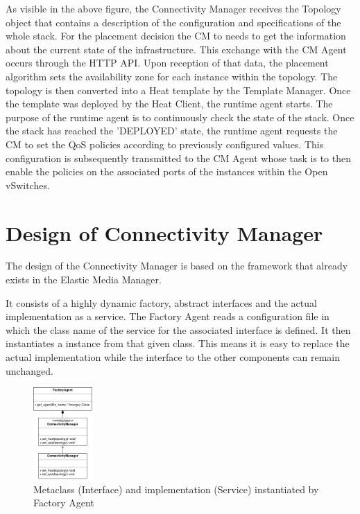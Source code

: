 As visible in the above figure, the Connectivity Manager receives the Topology object that contains a description of the configuration and specifications of the whole stack. For the placement decision the CM to needs to get the information about the current state of the infrastructure. This exchange with the CM Agent occurs through the HTTP API. Upon reception of that data, the placement algorithm sets the availability zone for each instance within the topology. The topology is then converted into a Heat template by the Template Manager. Once the template  was deployed by the Heat Client, the runtime agent starts. The purpose of the runtime agent is to continuously check the state of the stack. Once the stack has reached the 'DEPLOYED' state, the runtime agent requests the CM to set the QoS policies according to previously configured values. This configuration is subsequently transmitted to the CM Agent whose task is to then enable the policies on the associated ports of the instances within the Open vSwitches.


\section{Design of Connectivity Manager}

The design of the Connectivity Manager is based on the framework that already exists in the Elastic Media Manager.

It consists of a highly dynamic factory, abstract interfaces and the actual implementation as a service.
The Factory Agent reads a configuration file in which the class name of the service for the associated interface is defined. It then instantiates a instance from that given class. This means it is easy to replace the actual implementation while the interface to the other components can remain unchanged.

\begin{figure}[H]
\centering

\includegraphics[width=0.2\textwidth]{images/design/cm-emm_interface_classes}

\caption{Metaclass (Interface) and implementation (Service) instantiated by Factory Agent}
\end{figure}

